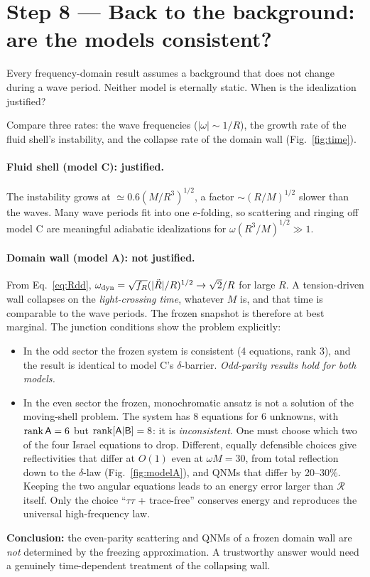 \documentclass[11pt,a4paper]{article}
\numberwithin{equation}{section}
\newcommand{\sq}{\sqrt{f_R}}
\newcommand{\RR}{\mathcal R}
\begin{document}
\section{Step 8 --- Back to the background: are the models consistent?}\label{sec:backto1}
\begin{question}
Every frequency-domain result assumes a background that does not change during a wave period. Neither model is
eternally static. When is the idealization justified?
\end{question}
\begin{keyidea}
Compare three rates: the wave frequencies ($|\omega|\sim1/R$), the growth rate of the fluid shell's instability, and
the collapse rate of the domain wall (Fig.~\ref{fig:time}).
\end{keyidea}
\paragraph{Fluid shell (model C): justified.} The instability grows at $\simeq0.6(M/R^3)^{1/2}$, a factor
$\sim(R/M)^{1/2}$ slower than the waves. Many wave periods fit into one $e$-folding, so scattering and ringing off model C
are meaningful adiabatic idealizations for $\omega(R^3/M)^{1/2}\gg1$.

\paragraph{Domain wall (model A): not justified.} From Eq.~\eqref{eq:Rdd}, $\omega_{\rm dyn}=\sq(|\ddot R|/R)^{1/2}\to\sqrt2/R$
for large $R$. A tension-driven wall collapses on the \emph{light-crossing time}, whatever $M$ is, and that time is
comparable to the wave periods. The frozen snapshot is therefore at best marginal. The junction conditions show the
problem explicitly:
\begin{itemize}
\item In the odd sector the frozen system is consistent (4 equations, rank 3), and the result is identical to model C's
$\delta$-barrier. \emph{Odd-parity results hold for both models.}
\item In the even sector the frozen, monochromatic ansatz is not a solution of the moving-shell problem. The system has
8 equations for 6 unknowns, with ${\rm rank}\,\mathsf A=6$ but ${\rm rank}[\mathsf A|\mathsf B]=8$: it is
\emph{inconsistent}. One must choose which two of the four Israel equations to drop. Different, equally defensible
choices give reflectivities that differ at $O(1)$ even at $\omega M=30$, from total reflection down to the
$\delta$-law (Fig.~\ref{fig:modelA}), and QNMs that differ by 20--30\%. Keeping the two angular equations leads to
an energy error larger than $\RR$ itself. Only the choice ``$\tau\tau$ + trace-free'' conserves energy and reproduces the
universal high-frequency law.
\end{itemize}
\textbf{Conclusion:} the even-parity scattering and QNMs of a frozen domain wall are \emph{not} determined by the
freezing approximation. A trustworthy answer would need a genuinely time-dependent treatment of the collapsing wall.
\end{document}
